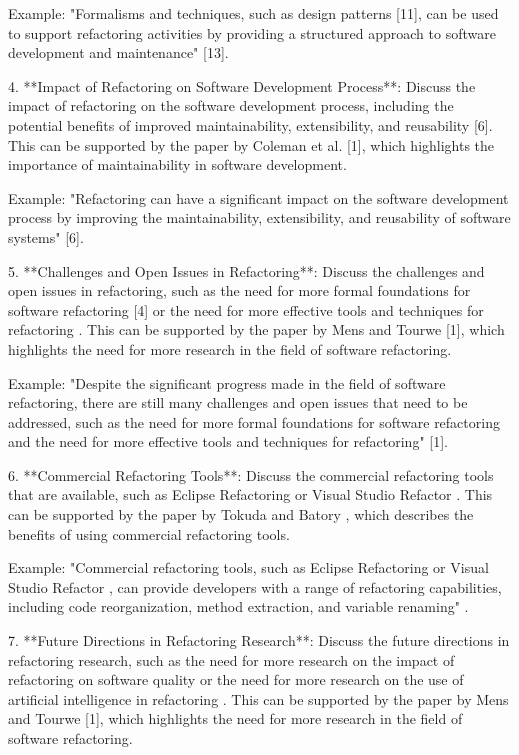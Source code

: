Example:
"Formalisms and techniques, such as design patterns [11], can be used to support refactoring activities by providing a structured approach to software development and maintenance" [13].

4. **Impact of Refactoring on Software Development Process**: Discuss the impact of refactoring on the software development process, including the potential benefits of improved maintainability, extensibility, and reusability [6]. This can be supported by the paper by Coleman et al. [1], which highlights the importance of maintainability in software development.

Example:
"Refactoring can have a significant impact on the software development process by improving the maintainability, extensibility, and reusability of software systems" [6].

5. **Challenges and Open Issues in Refactoring**: Discuss the challenges and open issues in refactoring, such as the need for more formal foundations for software refactoring [4] or the need for more effective tools and techniques for refactoring . This can be supported by the paper by Mens and Tourwe [1], which highlights the need for more research in the field of software refactoring.

Example:
"Despite the significant progress made in the field of software refactoring, there are still many challenges and open issues that need to be addressed, such as the need for more formal foundations for software refactoring and the need for more effective tools and techniques for refactoring" [1].

6. **Commercial Refactoring Tools**: Discuss the commercial refactoring tools that are available, such as Eclipse Refactoring  or Visual Studio Refactor . This can be supported by the paper by Tokuda and Batory , which describes the benefits of using commercial refactoring tools.

Example:
"Commercial refactoring tools, such as Eclipse Refactoring  or Visual Studio Refactor , can provide developers with a range of refactoring capabilities, including code reorganization, method extraction, and variable renaming" .

7. **Future Directions in Refactoring Research**: Discuss the future directions in refactoring research, such as the need for more research on the impact of refactoring on software quality  or the need for more research on the use of artificial intelligence in refactoring . This can be supported by the paper by Mens and Tourwe [1], which highlights the need for more research in the field of software refactoring.

